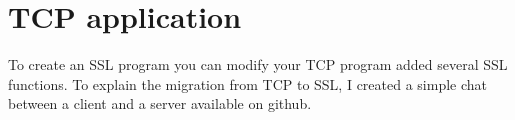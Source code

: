 \documentclass[a4paper,12pt]{report}
\begin{document}
\section{TCP application}
To create an SSL program you can modify your TCP program added several SSL functions. To explain the migration from TCP to SSL, I created a simple chat between a client and a server available on github.

\end{document}

